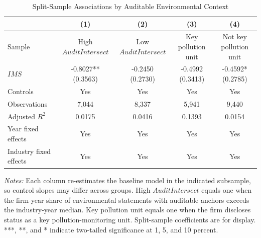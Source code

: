 \begin{table}[htbp]
    \centering
    \caption{Split-Sample Associations by Auditable Environmental Context}
    \label{tab:scope-splits}
    \renewcommand{\arraystretch}{1.35}
    \begin{tabular}{lcccc}
        \toprule
        & (1) & (2) & (3) & (4) \\
        \midrule
        Sample & High \(AuditIntersect\) & Low \(AuditIntersect\) & Key pollution unit & Not key pollution unit \\
        \(IMS\) & \shortstack{-0.8027** \\ (0.3563)} & \shortstack{-0.2450 \\ (0.2730)} & \shortstack{-0.4992 \\ (0.3413)} & \shortstack{-0.4592* \\ (0.2785)} \\
        Controls & Yes & Yes & Yes & Yes \\
        Observations & 7,044 & 8,337 & 5,941 & 9,440 \\
        Adjusted $R^2$ & 0.0175 & 0.0416 & 0.1393 & 0.0154 \\
        Year fixed effects & Yes & Yes & Yes & Yes \\
        Industry fixed effects & Yes & Yes & Yes & Yes \\
        \bottomrule
    \end{tabular}
    \par\smallskip
    \begin{minipage}{0.95\textwidth}
        \footnotesize
        \textit{Notes:} Each column re-estimates the baseline model in the indicated subsample, so control slopes may differ across groups. High \(AuditIntersect\) equals one when the firm-year share of environmental statements with auditable anchors exceeds the industry-year median. Key pollution unit equals one when the firm discloses status as a key pollution-monitoring unit. Split-sample coefficients are for display. ***, **, and * indicate two-tailed significance at 1, 5, and 10 percent.
    \end{minipage}
\end{table}